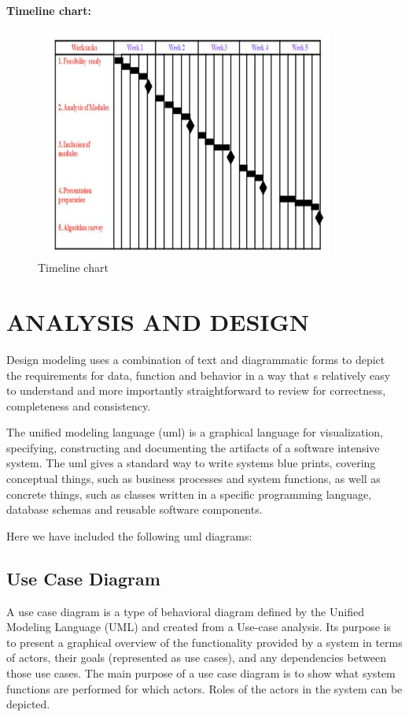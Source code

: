 \documentclass[a4paper,14pt,onecolumn]{article}
\begin{document}
\textbf{Timeline chart:}\\
 \begin{figure}[h!]
\begin{center}
\includegraphics[height=3in,width=4in]
{timeline.jpg}  
\caption{Timeline chart}
\end{center}
\end{figure}

\newpage
\section{ANALYSIS AND DESIGN}
Design modeling uses a combination of text and diagrammatic forms to depict the requirements for data, function and behavior in a way that s relatively easy to understand and more importantly straightforward to review for correctness, completeness and consistency.
\begin{sloppypar}
The unified modeling language (uml) is a graphical language for visualization, specifying, constructing and documenting the artifacts of a software intensive system. The uml gives a standard way to write systems blue prints, covering conceptual things, such as business processes and system functions, as well as concrete things, such as classes written in a specific programming language, database schemas and reusable software components.\end{sloppypar}
Here we have included the following uml diagrams:
\subsection{Use Case Diagram}
A use case diagram is a type of behavioral diagram defined by the Unified Modeling
Language (UML) and created from a Use-case analysis. Its purpose is to present a graphical
overview of the functionality provided by a system in terms of actors, their goals (represented as use cases), and any dependencies between those use cases. The main purpose of a use case
diagram is to show what system functions are performed for which actors. Roles of the actors in
the system can be depicted.\\
\end{document}
